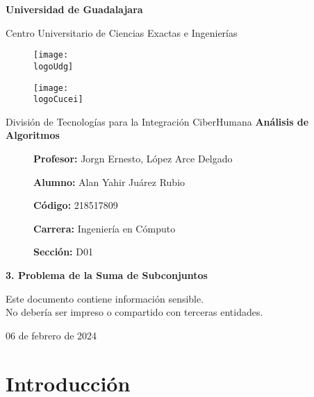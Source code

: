 \documentclass[12pt, a4paper]{article} %
\title{\theTitle}
\author{\theAuthor}
\newcommand{\logoUdg}{../../../../../attachments/images/portada-udg.jpeg}
\newcommand{\logoCucei}{../../../../../attachments/images/portada-cucei.jpeg}
\newcommand{\materia}{Análisis de Algoritmos}
\newcommand{\theTitle}{3. Problema de la Suma de Subconjuntos}
\newcommand{\profesor}{Jorgn Ernesto, López Arce Delgado}
\newcommand{\theAuthor}{Alan Yahir Juárez Rubio}
\newcommand{\code}{218517809}
\newcommand{\carrera}{Ingeniería en Cómputo}
\newcommand{\seccion}{D01}
\newcommand{\startDate}{06 de febrero de 2024}
\newcommand{\nl}{\par\vspace{0.4cm}}
\begin{document}
\cfoot{\thepage} %

\begin{titlepage}
	\centering
	{\huge\textbf{Universidad de Guadalajara}}\par\vspace{0.6cm}
	{\LARGE{Centro Universitario de Ciencias Exactas e Ingenierías}}\vfill
	
	\begin{figure}[h]
		\begin{minipage}[t]{0.45\textwidth}
			\centering
			\texttt{[image: \\logoUdg]}
		\end{minipage}
		\hfill
		\begin{minipage}[t]{0.45\textwidth}
			\centering
			\texttt{[image: \\logoCucei]}
		\end{minipage}
	\end{figure}\vfill
	
	{\Large{División de Tecnologías para la Integración CiberHumana}}\vfill
	{\Large\textbf{\materia}}\vfill
	\begin{figure}[h]
		\centering
		\begin{minipage}[t]{0.75\textwidth}
			{\Large
				\textbf{Profesor:} \profesor\nl
				\textbf{Alumno:} \theAuthor\nl
				\textbf{Código:} \code\nl
				\textbf{Carrera:} \carrera\nl
				\textbf{Sección:} \seccion
			}
		\end{minipage}
	\end{figure}\vfill
	{\LARGE{\textbf{\theTitle}}}\vfill
	
	\begin{tcolorbox}[colback=red!5!white, colframe=red!75!black]
		\centering
		Este documento contiene información sensible.\\
		No debería ser impreso o compartido con terceras entidades.
	\end{tcolorbox}\vfill
	{\large \startDate}\par
\end{titlepage}

\clearpage
\tableofcontents

	

\clearpage
\section{Introducción}
\end{document}
